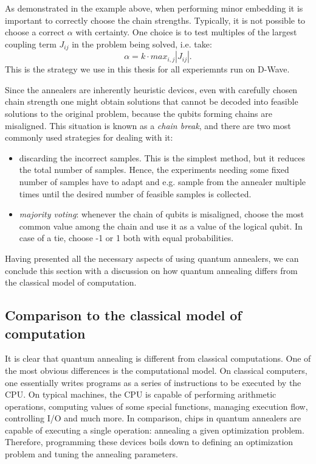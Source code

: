 As demonstrated in the example above, when performing minor embedding it is important to correctly
choose the chain strengths. Typically, it is not possible to choose a correct $\alpha$ with
certainty. One choice is to test multiples of the largest coupling term
$J_{ij}$ in the problem being solved, i.e. take:
\begin{equation}
\alpha = k \cdot max_{i, j} |J_{ij}|.
\end{equation}
This is the strategy we use in this thesis for all experiemnts run on D-Wave.

Since the annealers are inherently heuristic devices, even with carefully chosen chain strength one
might obtain solutions that cannot be decoded into feasible solutions to the original problem,
because the qubits forming chains are misaligned. This situation is known as a \emph{chain break},
and there are two most commonly used strategies for dealing with it:

\begin{itemize}
\item discarding the incorrect samples. This is the simplest method, but it reduces the total number
of samples. Hence, the experiments needing some fixed number of samples have to adapt and e.g.
sample from the annealer multiple times until the desired number of feasible samples is collected.
\item \emph{majority voting}: whenever the chain of qubits is misaligned, choose the most common value
among the chain and use it as a value of the logical qubit. In case of a tie, choose
-1 or 1 both with equal probabilities.
\end{itemize}

Having presented all the necessary aspects of using quantum annealers, we can conclude this section
with a discussion on how quantum annealing differs from the classical model of computation.

\subsection{Comparison to the classical model of computation}
It is clear that quantum annealing is different from classical computations. One of the
most obvious differences is the computational model. On classical computers, one essentially writes
programs as a series of instructions to be executed by the CPU. On typical machines, the CPU is
capable of performing arithmetic operations, computing values of some special functions, managing
execution flow, controlling I/O and much more. In comparison, chips in quantum annealers are capable
of executing a single operation: annealing a given optimization problem. Therefore, programming
these devices boils down to defining an optimization problem and tuning the annealing parameters.


